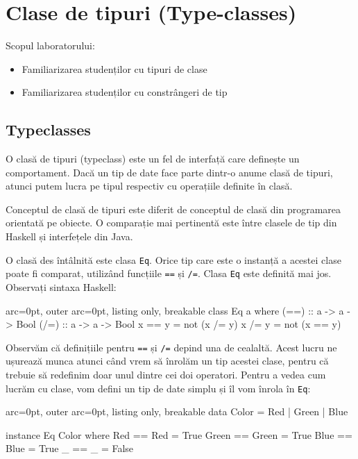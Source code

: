 \section*{ Clase de tipuri (Type-classes) }

Scopul laboratorului:
\begin{itemize}
	\item  Familiarizarea studenților cu tipuri de clase
	\item  Familiarizarea studenților cu constrângeri de tip
\end{itemize}

\subsection*{ Typeclasses }

O clasă de tipuri (typeclass) este un fel de interfață care definește un comportament. Dacă un tip de date face parte dintr-o anume clasă de tipuri, atunci putem lucra pe tipul respectiv cu operațiile definite în clasă.

\begin{tcolorbox}[colback=blue!10, colframe=blue!20]
Conceptul de clasă de tipuri este diferit de conceptul de clasă din programarea orientată pe obiecte. O comparație mai pertinentă este între clasele de tip din Haskell și interfețele din Java.
\end{tcolorbox}

O clasă des întâlnită este clasa \texttt{Eq}. Orice tip care este o instanță a acestei clase poate fi comparat, utilizând funcțiile \texttt{==} și \texttt{/=}. Clasa \texttt{Eq} este definită mai jos. Observați sintaxa Haskell:


\begin{tcblisting}{ arc=0pt, outer arc=0pt, listing only, breakable}
class Eq a where  
    (==) :: a -> a -> Bool  
    (/=) :: a -> a -> Bool  
    x == y = not (x /= y)  
    x /= y = not (x == y)  

\end{tcblisting}


Observăm că definițiile pentru \texttt{==} și \texttt{/=} depind una de cealaltă. Acest lucru ne ușurează munca atunci când vrem să înrolăm un tip acestei clase, pentru că trebuie să redefinim doar unul dintre cei doi operatori.
Pentru a vedea cum lucrăm cu clase, vom defini un tip de date simplu și îl vom înrola în \texttt{Eq}:


\begin{tcblisting}{ arc=0pt, outer arc=0pt, listing only, breakable}
data Color = Red | Green | Blue

instance Eq Color where
    Red == Red = True
    Green == Green = True
    Blue == Blue = True
    _ == _ = False

\end{tcblisting}


